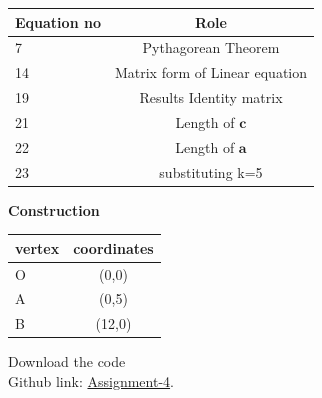 \documentclass[10pt,a4paper]{report}
\begin{document}
\begin{multicols}{2}
\begin{center}
\begin{tabular}{|l|c|}
    \hline 
    \textbf{Equation no} & \textbf{Role} \\ \hline
    7 &  Pythagorean Theorem \\ 
    14 & Matrix form of Linear equation  \\
    19 & Results Identity matrix  \\
    21 & Length of $\boldsymbol{c}$\\
    22 & Length of $\boldsymbol{a}$\\
    23 & substituting k=5\\
    \hline
      \end{tabular}
  \end{center} \vspace{2mm}
  
 \vspace{2mm} \textbf{Construction}
\begin{center}
\setlength{\arrayrulewidth}{0.5mm}
\setlength{\tabcolsep}{5pt}
\renewcommand{\arraystretch}{3}
    \begin{tabular}{|l|c|}
    \hline 
    \textbf{vertex} & \textbf{coordinates} \\ \hline
    O & (0,0)  \\ 
    A & (0,5)  \\
    B & (12,0) \\
    \hline
      \end{tabular}
  \end{center}
  
\raggedright  Download the code \\
Github link: \href{https://github.com/chiragshah1244/FWC/blob/main/assignments/assignment-1/code/src/seq.cpp}{Assignment-4}.
  \end{multicols}
\end{document}

